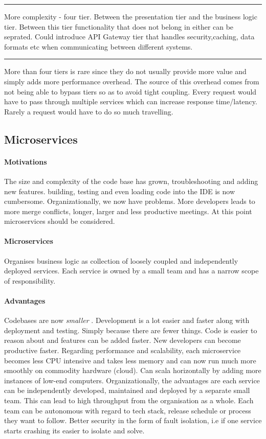 \documentclass[a4paper, 11pt]{book}
\begin{document}
    \hrule
    More complexity - four tier.
    Between the presentation tier and the business logic tier.
    Between this tier functionality that does not belong in either can be seprated.
    Could introduce API Gateway tier that handles security,caching, data formats etc when communicating between different systems.

    \hrule
    More than four tiers is rare since they do not usually provide more value and simply adds more performance overhead.
    The source of this overhead comes from not being able to bypass tiers so as to avoid tight coupling.
    Every request would have to pass through multiple services which can increase response time/latency.
    Rarely a request would have to do so much travelling.

    \subsection{Microservices}

    \paragraph{Motivations}
    The size and complexity of the code base has grown, troubleshooting and adding new features.
    building, testing and even loading code into the IDE is now cumbersome.
    Organizationally, we now have problems.
    More developers leads to more merge conflicts, longer, larger and less productive meetings.
    At this point microservices should be considered.

    \paragraph{Microservices}
    Organises business logic as collection of loosely coupled and independently deployed services.
    Each service is owned by a small team and has a narrow scope of responsibility.

    \paragraph{Advantages}
    Codebases are now \textit{smaller} .
    Development is a lot easier and faster along with deployment and testing.
    Simply because there are fewer things.
    Code is easier to reason about and features can be added faster.
    New developers can become productive faster.
    Regarding performance and scalability, each microservice becomes less CPU intensive and takes less memory and can now run much more smoothly on commodity hardware (cloud).
    Can scala horizontally by adding more instances of low-end computers.
    Organizationally, the advantages are each service can be independently developed, maintained and deployed by a separate small team.
    This can lead to high throughput from the organisation as a whole.
    Each team can be autonomous with regard to tech stack, release schedule or process they want to follow.
    Better security in the form of fault isolation, i.e if one service starts crashing its easier to isolate and solve.
\end{document}
